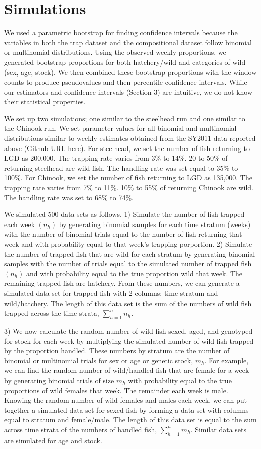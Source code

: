 \documentclass[12pt]{article}
\begin{document}
\section{Simulations}

We used a parametric bootstrap for finding confidence intervals because the variables in both the trap dataset and the compositional dataset follow binomial or multinomial distributions. Using the observed weekly proportions, we generated bootstrap proportions for both  hatchery/wild and categories of wild (sex, age, stock). We then combined these bootstrap proportions with the window counts to produce pseudovalues and then percentile confidence intervals. While our estimators and confidence intervals (Section 3) are intuitive, we do not know their statistical properties.

We set up two simulations; one similar to the steelhead run and one similar to the Chinook run. We set parameter values for all binomial and multinomial distributions similar to weekly estimates obtained from the SY2011 data reported above (Github URL here). For steelhead, we set the number of fish returning to LGD as 200,000. The trapping rate varies from 3\% to 14\%. 20 to 50\% of returning steelhead are wild fish. The handling rate was set equal to 35\% to 100\%. For Chinook, we set the number of fish returning to LGD as 135,000. The trapping rate varies from 7\% to 11\%. 10\% to 55\% of returning Chinook are wild. The handling rate was set to 68\% to 74\%.

We simulated 500 data sets as follows. 1) Simulate the number of fish trapped each week $(n_h)$ by generating binomial samples for each time stratum (weeks) with the number of binomial trials equal to the number of fish returning that week and with probability equal to that week's trapping porportion. 2) Simulate the number of trapped fish that are wild for each stratum by generating binomial samples with the number of trials equal to the simulated number of trapped fish $(n_h)$ and with probability equal to the true proportion wild that week. The remaining trapped fish are hatchery. From these numbers, we can generate a simulated data set for trapped fish with 2 columns: time stratum and wild/hatchery. The length of this data set is the sum of the numbers of wild fish trapped across the time strata, \(\sum\limits_{h=1}^{n} n_h\).

3) We now calculate the random number of wild fish sexed, aged, and genotyped for stock for each week by multiplying the simulated number of wild fish trapped by the proportion handled. These numbers by stratum are the number of binomial or multinomial trials for sex or age or genetic stock, \(m_h\). For example, we can find the random number of wild/handled fish that are female for a week by generating binomial trials of size \(m_h\) with probability equal to the true proportions of wild females that week. The remainder each week is male. Knowing the random number of wild females and males each week, we can put together a simulated data set for sexed fish by forming a data set with columns equal to stratum and female/male. The length of this data set is equal to the sum across time strata of the numbers of handled fish,  \(\sum\limits_{h=1}^{n} m_h\). Similar data sets are simulated for age and stock.
\end{document}
